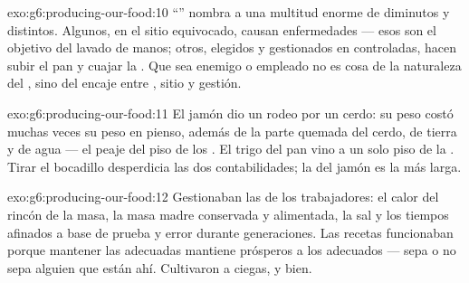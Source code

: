 \begin{solution}{exo:g6:producing-our-food:10}
``'' nombra a una multitud enorme de  diminutos y
distintos. Algunos, en el sitio equivocado, causan enfermedades ---
esos son el objetivo del lavado de manos; otros, elegidos y gestionados
en  controladas, hacen subir el pan y cuajar la . Que
sea enemigo o empleado no es cosa de la naturaleza del , sino
del encaje entre , sitio y gestión.
\end{solution}

\begin{solution}{exo:g6:producing-our-food:11}
El jamón dio un rodeo por un cerdo: su peso costó muchas veces su peso
en pienso, además de la parte quemada del cerdo, de tierra y de agua
--- el peaje del piso de los . El trigo del pan vino a un
solo piso de la . Tirar el bocadillo desperdicia las dos
contabilidades; la del jamón es la más larga.
\end{solution}

\begin{solution}{exo:g6:producing-our-food:12}
Gestionaban las \emph{} de los trabajadores: el calor del
rincón de la masa, la masa madre conservada y alimentada, la sal y los
tiempos afinados a base de prueba y error durante generaciones. Las
recetas funcionaban porque mantener las  adecuadas mantiene
prósperos a los  adecuados --- sepa o no sepa alguien que
están ahí. Cultivaron  a ciegas, y bien.
\end{solution}

